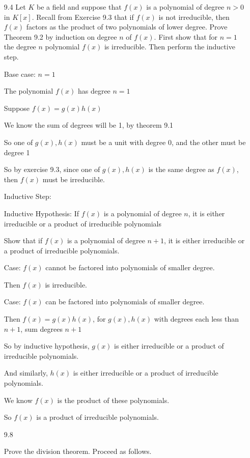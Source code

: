 \documentclass[12pt]{article}
\begin{document}
\begin{itemize}
\item[9.4]
  Let $K$ be a field and suppose that $f(x)$ is a polynomial of degree $n > 0$ in $K[x]$. Recall from Exercise 9.3 that if $f(x)$ is not irreducible, then $f(x)$ factors as the product of two polynomials of lower degree. Prove Theorem 9.2 by induction on degree $n$ of $f(x)$. First show that for $n = 1$ the degree $n$ polynomial $f(x)$ is irreducible. Then perform the inductive step.

  Base case: $n = 1$

  The polynomial $f(x)$ has degree $n = 1$

  Suppose $f(x) = g(x)h(x)$

  We know the sum of degrees will be 1, by theorem 9.1

  So one of $g(x), h(x)$ must be a unit with degree 0, and the other must be degree 1

  So by exercise 9.3, since one of $g(x), h(x)$ is the same degree as $f(x)$, then $f(x)$ must be irreducible.

  Inductive Step:

  Inductive Hypothesis: If $f(x)$ is a polynomial of degree $n$, it is either irreducible or a product of irreducible polynomials

  Show that if $f(x)$ is a polynomial of degree $n + 1$, it is either irreducible or a product of irreducible polynomials.

  Case: $f(x)$ cannot be factored into polynomials of smaller degree.

  Then $f(x)$ is irreducible.

  Case: $f(x)$ can be factored into polynomials of smaller degree.

  Then $f(x) = g(x)h(x)$, for $g(x), h(x)$ with degrees each less than $n+1$, sum degrees $n+1$

  So by inductive hypothesis, $g(x)$ is either irreducible or a product of irreducible polynomials.

  And similarly, $h(x)$ is either irreducible or a product of irreducible polynomials.

	We know $f(x)$ is the product of these polynomials.

  So $f(x)$ is a product of irreducible polynomials.

  \newpage

\item[9.8]
	
	Prove the division theorem. Proceed as follows.


\end{itemize}
\end{document}
